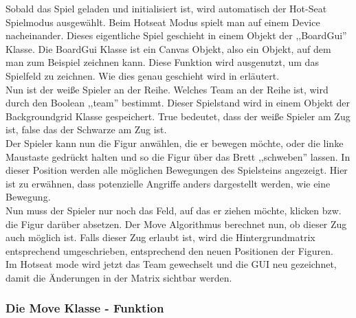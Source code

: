 \documentclass[12pt,a4paper]{article}
\begin{document}
{Sobald das Spiel geladen und initialisiert ist, wird automatisch der Hot-Seat Spielmodus ausgewählt. Beim Hotseat Modus spielt man auf einem Device nacheinander. Dieses eigentliche Spiel geschieht in einem Objekt der ,,BoardGui'' Klasse. Die BoardGui Klasse ist ein Canvas Objekt, also ein Objekt, auf dem man zum Beispiel zeichnen kann. Diese Funktion wird ausgenutzt, um das Spielfeld zu zeichnen. Wie dies genau geschieht wird in \textbf{ %
 } 
erläutert.  \\
Nun ist der weiße Spieler an der Reihe. Welches Team an der Reihe ist, wird durch den Boolean ,,team'' bestimmt. Dieser Spielstand wird in einem Objekt der Backgroundgrid Klasse gespeichert. True bedeutet, dass der weiße Spieler am Zug ist, false das der Schwarze am Zug ist. \\
Der Spieler kann nun die Figur anwählen, die er bewegen möchte, oder die linke Maustaste gedrückt halten und so die Figur über das Brett ,,schweben'' lassen. In dieser Position werden alle möglichen Bewegungen des Spielsteins angezeigt. Hier ist zu erwähnen, dass potenzielle Angriffe anders dargestellt werden, wie eine Bewegung. \\
Nun muss der Spieler nur noch das Feld, auf das er ziehen möchte, klicken bzw. die Figur darüber absetzen. Der Move Algorithmus berechnet nun, ob dieser Zug auch möglich ist. Falls dieser Zug erlaubt ist, wird die Hintergrundmatrix entsprechend umgeschrieben, entsprechend den neuen Positionen der Figuren. \\
Im Hotseat mode wird jetzt das Team gewechselt und die GUI neu gezeichnet, damit die Änderungen in der Matrix sichtbar werden. 

\subsubsection{Die Move Klasse - Funktion}
\label{SUBSUBSEC:MOVE}

}
\end{document}
